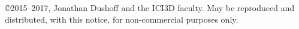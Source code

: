 \copyright 2015--2017, Jonathan Dushoff and the ICI3D faculty.  May be reproduced and distributed, with this notice, for non-commercial purposes only.
